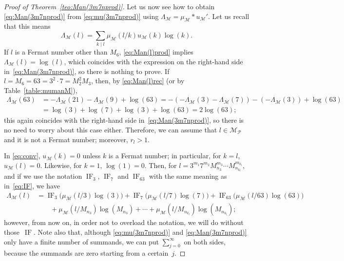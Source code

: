 \documentclass[11pt, a4paper]{article}
\newcommand{\calM}{\mathcal{M}}
\newcommand{\manM}{\Lambda_{\calM}}
\newcommand{\uM}{u_\calM}
\newcommand{\muM}{\mu_\calM}
\newcommand{\Mp}{\calM_{\mathcal{P}}}
\newcommand{\IF}{\operatorname{IF}}
\theoremstyle{plain}
\theoremstyle{definition}
\begin{document}
\begin{proof}[Proof of Theorem~\ref{teo:Man(3m7nprod)}]
Let us now see how to obtain \eqref{eq:Man(3m7nprod)} from \eqref{eq:mu(3m7nprod)} using $\manM = \muM * \uM'$.
Let us recall that this means
\begin{equation}
\label{eq:conv}
  \manM(l) = \sum_{k \mid l} \muM(l/k) \uM(k) \log(k).
\end{equation}
If $l$ is a Fermat number other than $M_6$, \eqref{eq:Man(l)prod} implies $\manM(l) = \log(l)$,
which coincides with the expression on the right-hand side in~\eqref{eq:Man(3m7nprod)}, so there is nothing to prove. 
If $l = M_6 = 63 = 3^2 \cdot 7 = M_2^2M_3$, then, by \eqref{eq:Man(l)rec} (or by Table~\ref{table:mumanM}),
\begin{align*}
  \manM(63) &= - \manM(21) - \manM(9) + \log(63)
  = -(-\manM(3)-\manM(7)) - ({-\manM(3)}) + \log(63) \\
  &= \log(3) + \log(7) + \log(3) + \log(63) = 2\log(63);
\end{align*}
this again coincides with the right-hand side in~\eqref{eq:Man(3m7nprod)}, so there is no need to worry about this case either.
Therefore, we can assume that $l \in \Mp$ and it is not a Fermat number; 
moreover, $r_l > 1$.

In \eqref{eq:conv}, $\uM(k)=0$ unless $k$ is a Fermat number; in particular, for $k=l$, $\uM(l) = 0$. Likewise, for $k=1$, $\log(1)=0$. Then, for $l = 3^{m_1} 7^{m_2} M_{n_3}^{m_3} \cdots M_{n_{k_l}}^{m_{k_l}}$, 
and if we use the notation $\IF_{3}$, $\IF_{7}$ and $\IF_{63}$ with the same meaning as in~\eqref{eq:IF},
we have
\begin{align*}
  \manM(l) &= \IF_3\bigl(\muM(l/3)\log(3)\bigr) + \IF_7\bigl(\muM(l/7)\log(7)\bigr) 
  + \IF_{63}\bigl(\muM(l/63)\log(63)\bigr) \\
  &\qquad + \muM(l/M_{n_3})\log(M_{n_3}) + \cdots + \muM(l/M_{n_{k_l}})\log(M_{n_{k_l}});
\end{align*}
however, from now on, in order not to overload the notation, we will do without those~$\IF$.
Note also that, although \eqref{eq:mu(3m7nprod)} and \eqref{eq:Man(3m7nprod)} only have a finite number of summands, we can put $\sum_{j=0}^{\infty}$ on both sides, because the summands are zero starting from a certain~$j$. 


\end{proof}
\end{document}
